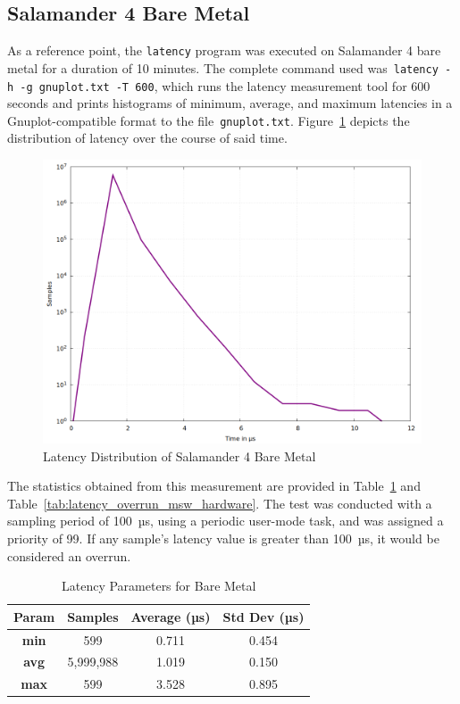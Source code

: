 \documentclass[MMR,Master,english]{style/twbook}
\begin{document}
\subsection{Salamander 4 Bare Metal}\label{subsec:salamander4-bare-metal}
As a reference point, the \texttt{latency} program was executed on Salamander 4 bare metal for a duration of 10 minutes. The complete command used was~\texttt{latency -h -g gnuplot.txt -T 600}, which runs the latency measurement tool for 600 seconds and prints histograms of minimum, average, and maximum latencies in a Gnuplot-compatible format to the file~\texttt{gnuplot.txt}. Figure~\ref{fig:gnuplot_max_latency_hardware} depicts the distribution of latency over the course of said time.

\begin{figure}[H]
	\centering
	\includegraphics[width=0.7\columnwidth]{img/implementation/gnuplot_max_latency_hardware.png}
	\caption[Latency Distribution of Salamander 4 Bare Metal]{Latency Distribution of Salamander 4 Bare Metal}
	\label{fig:gnuplot_max_latency_hardware}
\end{figure}

\noindent The statistics obtained from this measurement are provided in Table~\ref{tab:latency_stats_hardware} and Table~\ref{tab:latency_overrun_msw_hardware}. The test was conducted with a sampling period of 100~µs, using a periodic user-mode task, and was assigned a priority of 99. If any sample's latency value is greater than 100~µs, it would be considered an overrun.

\begin{table}[H]
	\centering
	\caption{Latency Parameters for Bare Metal}
	\label{tab:latency_stats_hardware}
	\begin{tabular}{|c|c|c|c|}
		\hline
		\textbf{Param} & \textbf{Samples} & \textbf{Average (µs)} & \textbf{Std Dev (µs)} \\ \hline
		\textbf{min}   & 599              & 0.711                 & 0.454                 \\ \hline
		\textbf{avg}   & 5,999,988        & 1.019                 & 0.150                 \\ \hline
		\textbf{max}   & 599              & 3.528                 & 0.895                 \\ \hline
	\end{tabular}
\end{table}
\end{document}
